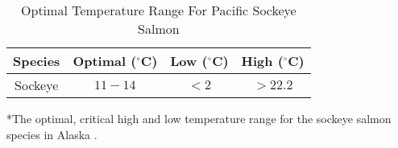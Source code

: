 \begin{table}[H]
    \centering
    \caption{Optimal Temperature Range For Pacific Sockeye Salmon}\label{tab:optimaltemp}
    \vspace{.75cm}
    \begin{tabular}{|c|c|c|c|}
    \hline
         \textbf{Species} & \textbf{Optimal ($^{\circ}$C)} & \textbf{Low ($^{\circ}$C)} & \textbf{High ($^{\circ}$C)}\\
         \hline
         Sockeye & $11-14$ & $<2$ & $>22.2$\\
         \hline
    \end{tabular}
    \vspace{1ex}
    
    {\singlespacing
    *The optimal, critical high and low temperature range for the sockeye salmon species in Alaska \cite{ADFG-optimal, carter2005effects}.\par}
\end{table}